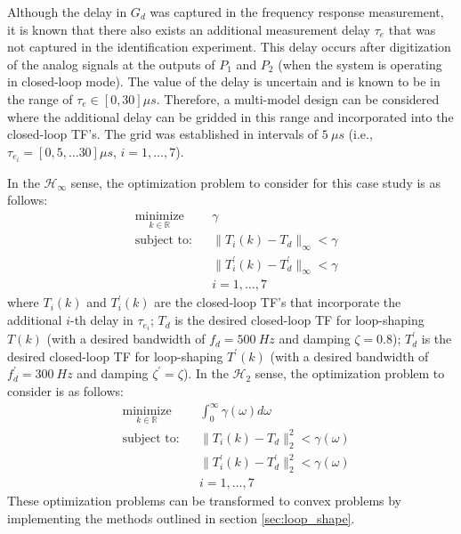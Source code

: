 \documentclass[a4paper, 10pt, conference]{ieeeconf}
\begin{document}
Although the delay in $G_d$ was captured in the frequency response measurement, it is known that there also exists an additional measurement delay $\tau_e$ that was not captured in the identification experiment. This delay occurs after digitization of the analog signals at the outputs of $P_1$ and $P_2$ (when the system is operating in closed-loop mode). The value of the delay is uncertain and is known to be in the range of $\tau_e \in [0,30]\mu s$. Therefore, a multi-model design can be considered where the additional delay can be gridded in this range and incorporated into the closed-loop TF's. The grid was established in intervals of $5 \: \mu s$ (i.e., $\tau_{e_i} = [0,5,\ldots30] \mu s$, $i = 1,\ldots,7$).  

In the $\mathcal{H}_{\infty}$ sense, the optimization problem to consider for this case study is as follows:
 \begin{equation} \label{eq:case_study_opt}
\begin{aligned}
& \underset{ k \in \mathbb{R}}{\text{minimize}}
& & \gamma  \\
& \text{subject to:} & & \|T_i(k)-T_d\|_{\infty}< \gamma \\
& &  &\|T_i^{\prime}(k)-T_d^{\prime}\|_{\infty}< \gamma \\ 
& & & i = 1,\ldots,7
\end{aligned}
\end{equation}
where $T_i(k)$ and $T_i^{\prime}(k)$ are the closed-loop TF's that incorporate the additional $i$-th delay in $\tau_{e_i}$; $T_d$ is the desired closed-loop TF for loop-shaping $T(k)$ (with a desired bandwidth of $f_d = 500 \: Hz$ and damping $\zeta = 0.8$); $T_d^{\prime}$ is the desired closed-loop TF for loop-shaping $T^{\prime}(k)$ (with a desired bandwidth of $f_d^{\prime} = 300 \: Hz$ and damping $\zeta^{\prime} = \zeta$). In the $\mathcal{H}_2$ sense, the optimization problem to consider is as follows:
\begin{equation} \label{eq:case_study_opt_2}
\begin{aligned}
& \underset{ k \in \mathbb{R}}{\text{minimize}}
& & \int_0^{\infty} \gamma(\omega) d\omega  \\
& \text{subject to:} & & \|T_i(k)-T_d\|_2^2< \gamma(\omega) \\
& &  &\|T_i^{\prime}(k)-T_d^{\prime}\|_2^2< \gamma(\omega) \\ 
& & & i = 1,\ldots,7
\end{aligned}
\end{equation}
These optimization problems can be transformed to convex problems by implementing the methods outlined in section \ref{sec:loop_shape}. 
\end{document}

